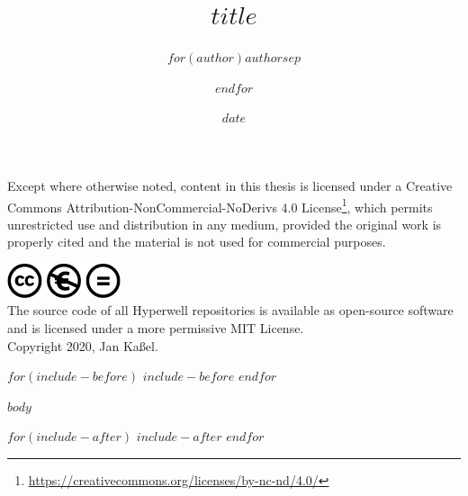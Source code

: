 \documentclass[11pt,a4paper]{report}
\date{$date$}
\author{$for(author)$$author$$sep$ \and $endfor$}
\title{$title$}
\begin{document}
\maketitle

\pagebreak


Except where otherwise noted, content in this thesis is licensed under a Creative Commons Attribution-NonCommercial-NoDerivs 4.0 License\footnote{\url{https://creativecommons.org/licenses/by-nc-nd/4.0/}}, which permits unrestricted use and distribution in any medium, provided the original work is properly cited and the material is not used for commercial purposes.

\vspace{2mm}
\includegraphics[width=0.25\textwidth]{layout/cc-nc-nd.pdf} \\

The source code of all Hyperwell repositories is available as open-source software and is licensed under a more permissive MIT License. \\

Copyright 2020, Jan Kaßel.

\pagebreak


\tableofcontents

$for(include-before)$
  $include-before$
$endfor$

$body$

$for(include-after)$
  $include-after$
$endfor$
\end{document}
